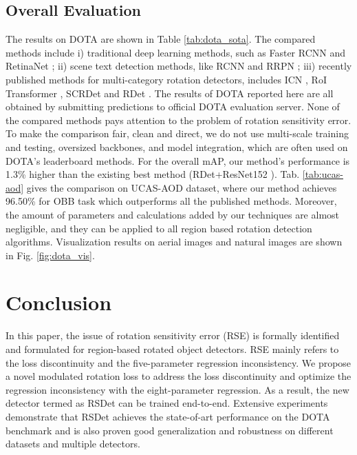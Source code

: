 \documentclass[10pt,twocolumn,letterpaper]{article}
\begin{document}
\subsection{Overall Evaluation}
The results on DOTA are shown in Table \ref{tab:dota_sota}. The compared methods include i) traditional deep learning methods, such as Faster RCNN \cite{R16_Ren2015Faster} and RetinaNet \cite{R25_Lin2017Focal}; ii) scene text detection methods, like RCNN \cite{R22_Jiang2017R2CNN} and RRPN \cite{R30_ma2018arbitrary}; iii) recently published methods for multi-category rotation detectors, includes ICN \cite{R27_azimi2018towards}, RoI Transformer \cite{R29_ding2018learning}, SCRDet \cite{R28_Yang2018SCRDet} and RDet \cite{R20_Yang2019R3Det}. The results of DOTA reported here are all obtained by submitting predictions to official DOTA evaluation server. None of the compared methods pays attention to the problem of rotation sensitivity error. To make the comparison fair, clean and direct, we do not use multi-scale training and testing, oversized backbones, and model integration, which are often used on DOTA's leaderboard methods. For the overall mAP, our method's performance is 1.3\% higher than the existing best method (RDet+ResNet152 \cite{R20_Yang2019R3Det}). Tab. \ref{tab:ucas-aod} gives the comparison on UCAS-AOD dataset, where our method achieves 96.50\% for OBB task which outperforms all the published methods. Moreover, the amount of parameters and calculations added by our techniques are almost negligible, and they can be applied to all region based rotation detection algorithms. Visualization results on aerial images and natural images are shown in Fig. \ref{fig:dota_vis}.

\section{Conclusion}
In this paper, the issue of rotation sensitivity error (RSE) is formally identified and formulated for region-based rotated object detectors. RSE mainly refers to the loss discontinuity and the five-parameter regression inconsistency. We propose a novel modulated rotation loss  to address the loss discontinuity and optimize the regression inconsistency with the eight-parameter regression. As a result, the new detector termed as RSDet can be trained end-to-end. Extensive experiments demonstrate that RSDet achieves the state-of-art performance on the DOTA benchmark and is also proven good generalization and robustness on different datasets and multiple detectors.

{\small


}
\end{document}

